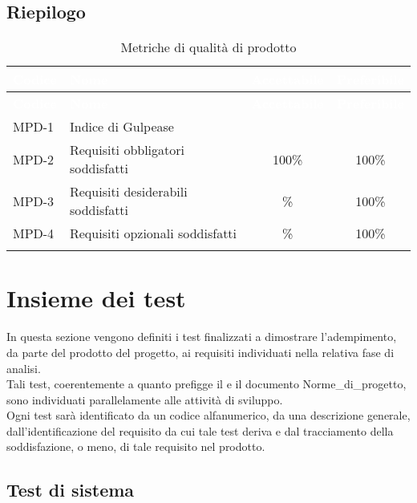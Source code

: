 \subsection{Riepilogo}
{
\setlength{\tabcolsep}{10pt}
\renewcommand{\arraystretch}{1.5}
\begin{xltabular}{\textwidth}{| l | X | c | c |}
    \hline
     \textbf{\textcolor{white}{Codice}} & \textbf{\textcolor{white}{Nome}} & \textbf{\textcolor{white}{Accettabile}} & \textbf{\textcolor{white}{Preferibile}} \\
    \hline
    \endfirsthead
    \hline
     \textbf{\textcolor{white}{Codice}} & \textbf{\textcolor{white}{Nome}} & \textbf{\textcolor{white}{Accettabile}} & \textbf{\textcolor{white}{Preferibile}} \\ 
    \endhead
    MPD-1 & Indice di Gulpease &  &  \\
    \hline
    MPD-2 & Requisiti obbligatori soddisfatti & 100\% & 100\% \\
    \hline
    MPD-3 & Requisiti desiderabili soddisfatti & \% & 100\% \\
    \hline
    MPD-4 & Requisiti opzionali soddisfatti & \% & 100\% \\
    \hline
     \caption{Metriche di qualità di prodotto}
    \label{tab:mpd}
\end{xltabular}
}

\section{Insieme dei test} \label{sec:test}
In questa sezione vengono definiti i test finalizzati a dimostrare l'adempimento, da parte del prodotto del progetto, ai requisiti individuati nella relativa fase di analisi.\\
Tali test, coerentemente a quanto prefigge il  e il documento Norme\_di\_progetto, sono individuati parallelamente alle attività di sviluppo.\\
Ogni test sarà identificato da un codice alfanumerico, da una descrizione generale, dall'identificazione del requisito da cui tale test deriva e dal tracciamento della soddisfazione, o meno, di tale requisito nel prodotto.

\subsection{Test di sistema}

